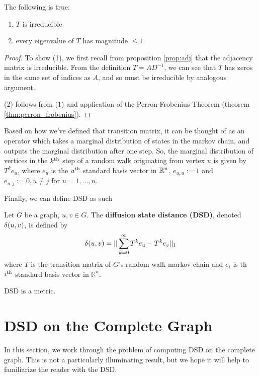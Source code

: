 \begin{proposition}[Properties of $T$]
  The following is true:
  \begin{enumerate}
  \item $T$ is irreducible
  \item every eigenvalue of $T$ has magnitude $\leq 1$
  \end{enumerate}
\end{proposition}

\begin{proof}
  To show (1), we first recall from proposition \ref{prop:adj} that the adjacency matrix is
  irreducible. From the definition $T = AD^{-1}$, we can see that $T$ has zeros in the same set of
  indices as $A$, and so must be irreducible by analogous argument.

  (2) follows from (1) and application of the Perron-Frobenius Theorem (theorem
  \ref{thm:perron_frobenius}).
\end{proof}

Based on how we've defined that transition matrix, it can be thought of as an operator which takes a
marginal distribution of states in the markov chain, and outputs the marginal distribution after one
step. So, the marginal distribution of vertices in the $k^{\mathrm{th}}$ step of a random walk originating
from vertex $u$ is given by $T^ke_u$, where $e_u$ is the $u^{\mathrm{th}}$ standard basis vector in $\mathbb{R}^n$,
$e_{u,u} := 1$ and $e_{u,j} := 0, u \neq j$ for $u=1,...,n$.

Finally, we can define DSD as such

\begin{definition}
  Let $G$ be a graph, $u,v \in G$. The \textbf{diffusion state distance (DSD)}, denoted $\delta(u,v)$,
  is defined by
  \[
    \delta(u,v) = ||\sum_{k =0}^{\infty}{T^ke_u - T^ke_v}||_1
  \]
  where $T$ is the transition matrix of $G$'s random walk markov chain and $e_i$ is th $i^{\mathrm{th}}$
  standard basis vector in $\mathbb{R}^n$.
\end{definition}

\begin{theorem}
  DSD is a metric.
\end{theorem}


\section{DSD on the Complete Graph}

In this section, we work through the problem of computing DSD on the complete graph. This is not a
particularly illuminating result, but we hope it will help to familiarize the reader with the DSD.

